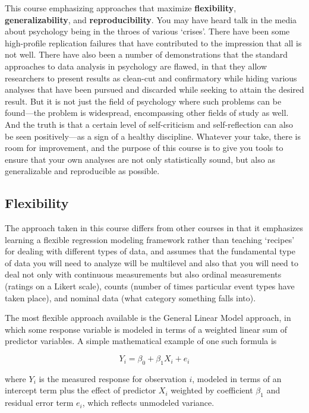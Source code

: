 \documentclass[]{book}
\begin{document}
This course emphasizing approaches that maximize \textbf{flexibility}, \textbf{generalizability}, and \textbf{reproducibility}. You may have heard talk in the media about psychology being in the throes of various `crises'. There have been some high-profile replication failures that have contributed to the impression that all is not well. There have also been a number of demonstrations that the standard approaches to data analysis in psychology are flawed, in that they allow researchers to present results as clean-cut and confirmatory while hiding various analyses that have been pursued and discarded while seeking to attain the desired result. But it is not just the field of psychology where such problems can be found---the problem is widespread, encompassing other fields of study as well. And the truth is that a certain level of self-criticism and self-reflection can also be seen positively---as a sign of a healthy discipline. Whatever your take, there is room for improvement, and the purpose of this course is to give you tools to ensure that your own analyses are not only statistically sound, but also as generalizable and reproducible as possible.

\hypertarget{flexibility}{%
\subsection{Flexibility}\label{flexibility}}

The approach taken in this course differs from other courses in that it emphasizes learning a flexible regression modeling framework rather than teaching `recipes' for dealing with different types of data, and assumes that the fundamental type of data you will need to analyze will be multilevel and also that you will need to deal not only with continuous measurements but also ordinal measurements (ratings on a Likert scale), counts (number of times particular event types have taken place), and nominal data (what category something falls into).

The most flexible approach available is the General Linear Model approach, in which some response variable is modeled in terms of a weighted linear sum of predictor variables. A simple mathematical example of one such formula is

\[Y_i = \beta_0 + \beta_1 X_i + e_i\]

where \(Y_i\) is the measured response for observation \(i\), modeled in terms of an intercept term plus the effect of predictor \(X_i\) weighted by coefficient \(\beta_1\) and residual error term \(e_i\), which reflects unmodeled variance.
\end{document}
